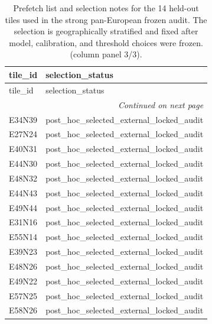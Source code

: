 \begin{landscape}
\scriptsize
\setlength{\LTleft}{0pt}
\setlength{\LTright}{0pt}
\begin{longtable}{ll}
\caption{Prefetch list and selection notes for the 14 held-out tiles used in the strong pan-European frozen audit. The selection is geographically stratified and fixed after model, calibration, and threshold choices were frozen. (column panel 3/3).}\label{tab:e7_strong_selected_tiles_part3}\\
\toprule
tile\_id & selection\_status \\
\midrule
\endfirsthead
\toprule
tile\_id & selection\_status \\
\midrule
\endhead
\midrule
\multicolumn{2}{r}{\textit{Continued on next page}} \\
\endfoot
\bottomrule
\endlastfoot
E34N39 & post\_hoc\_selected\_external\_locked\_audit \\
E27N24 & post\_hoc\_selected\_external\_locked\_audit \\
E40N31 & post\_hoc\_selected\_external\_locked\_audit \\
E44N30 & post\_hoc\_selected\_external\_locked\_audit \\
E48N32 & post\_hoc\_selected\_external\_locked\_audit \\
E44N43 & post\_hoc\_selected\_external\_locked\_audit \\
E49N44 & post\_hoc\_selected\_external\_locked\_audit \\
E31N16 & post\_hoc\_selected\_external\_locked\_audit \\
E55N14 & post\_hoc\_selected\_external\_locked\_audit \\
E39N23 & post\_hoc\_selected\_external\_locked\_audit \\
E48N26 & post\_hoc\_selected\_external\_locked\_audit \\
E49N22 & post\_hoc\_selected\_external\_locked\_audit \\
E57N25 & post\_hoc\_selected\_external\_locked\_audit \\
E58N26 & post\_hoc\_selected\_external\_locked\_audit \\
\bottomrule
\end{longtable}
\end{landscape}

